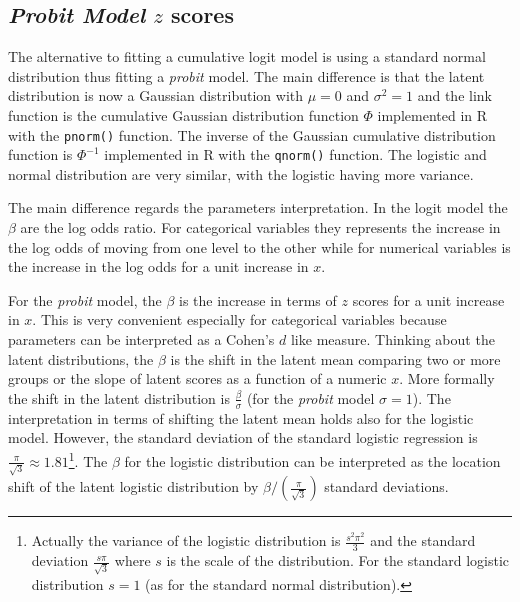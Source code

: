 \documentclass[
  man,floatsintext]{apa6}
\begin{document}
\normalsize

\subsection{\texorpdfstring{\emph{Probit Model} \(z\) scores}{Probit Model z scores}}\label{probit-model-z-scores}

The alternative to fitting a cumulative logit model is using a standard normal distribution thus fitting a \emph{probit} model. The main difference is that the latent distribution is now a Gaussian distribution with \(\mu = 0\) and \(\sigma^2 = 1\) and the link function is the cumulative Gaussian distribution function \(\Phi\) implemented in R with the \texttt{pnorm()} function. The inverse of the Gaussian cumulative distribution function is \(\Phi^{-1}\) implemented in R with the \texttt{qnorm()} function. The logistic and normal distribution are very similar, with the logistic having more variance.

The main difference regards the parameters interpretation. In the logit model the \(\beta\) are the log odds ratio. For categorical variables they represents the increase in the log odds of moving from one level to the other while for numerical variables is the increase in the log odds for a unit increase in \(x\).

For the \emph{probit} model, the \(\beta\) is the increase in terms of \(z\) scores for a unit increase in \(x\). This is very convenient especially for categorical variables because parameters can be interpreted as a Cohen's \(d\) like measure. Thinking about the latent distributions, the \(\beta\) is the shift in the latent mean comparing two or more groups or the slope of latent scores as a function of a numeric \(x\). More formally the shift in the latent distribution is \(\frac{\beta}{\sigma}\) (for the \emph{probit} model \(\sigma = 1\)). The interpretation in terms of shifting the latent mean holds also for the logistic model. However, the standard deviation of the standard logistic regression is \(\frac{\pi}{\sqrt{3}} \approx 1.81\)\footnote{Actually the variance of the logistic distribution is \(\frac{s^2\pi^2}{3}\) and the standard deviation \(\frac{s\pi}{\sqrt{3}}\) where \(s\) is the scale of the distribution. For the standard logistic distribution \(s = 1\) (as for the standard normal distribution).}. The \(\beta\) for the logistic distribution can be interpreted as the location shift of the latent logistic distribution by \(\beta/(\frac{\pi}{\sqrt{3}})\) standard deviations.
\end{document}
